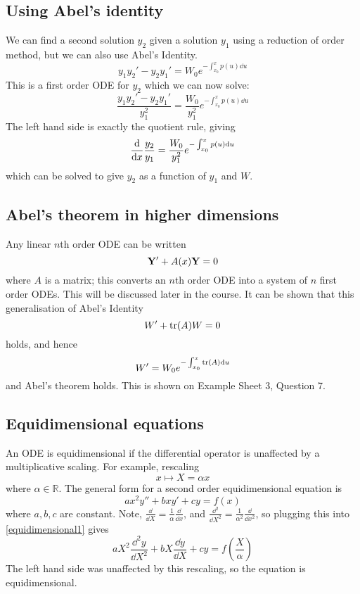 \subsection{Using Abel's identity}
We can find a second solution \(y_2\) given a solution \(y_1\) using a reduction of order method, but we can also use Abel's Identity.
\[
	y_1y_2' - y_2y_1' = W_0 e^{-\int_{x_0}^x p(u) \dd{u}}
\]
This is a first order ODE for \(y_2\) which we can now solve:
\[
	\frac{y_1y_2' - y_2y_1'}{y_1^2} =  \frac{W_0}{y_1^2} e^{-\int_{x_0}^x p(u) \dd{u}}
\]
The left hand side is exactly the quotient rule, giving
\[
	\dv{x}\frac{y_2}{y_1} = \frac{W_0}{y_1^2} e^{-\int_{x_0}^x p(u) \dd{u}}
\]
which can be solved to give \(y_2\) as a function of \(y_1\) and \(W\).

\subsection{Abel's theorem in higher dimensions}
Any linear \(n\)th order ODE can be written
\[
	\vb Y' + A(x) \vb Y = 0
\]
where \(A\) is a matrix; this converts an \(n\)th order ODE into a system of \(n\) first order ODEs.
This will be discussed later in the course.
It can be shown that this generalisation of Abel's Identity
\[
	W' + \tr(A)W = 0
\]
holds, and hence
\[
	W' = W_0e^{-\int_{x_0}^x \tr(A) \dd{u}}
\]
and Abel's theorem holds.
This is shown on Example Sheet 3, Question 7.

\subsection{Equidimensional equations}
An ODE is equidimensional if the differential operator is unaffected by a multiplicative scaling.
For example, rescaling
\[
	x \mapsto X = \alpha x
\]
where \(\alpha \in \mathbb R\).
The general form for a second order equidimensional equation is
\begin{equation}\label{equidimensional1}
	ax^2 y'' + bxy' + cy = f(x)
\end{equation}
where \(a, b, c\) are constant.
Note, \(\frac{\dd}{\dd{X}} = \frac{1}{\alpha}\frac{\dd}{\dd{x}}\), and \(\frac{\dd^2}{\dd{X}^2} = \frac{1}{\alpha^2}\frac{\dd}{\dd{x}^2}\), so plugging this into \eqref{equidimensional1} gives
\[
	aX^2\frac{\dd^2 y}{\dd{X}^2} + bX\frac{\dd{y}}{\dd{X}} + cy = f\left(\frac{X}{\alpha}\right)
\]
The left hand side was unaffected by this rescaling, so the equation is equidimensional.

